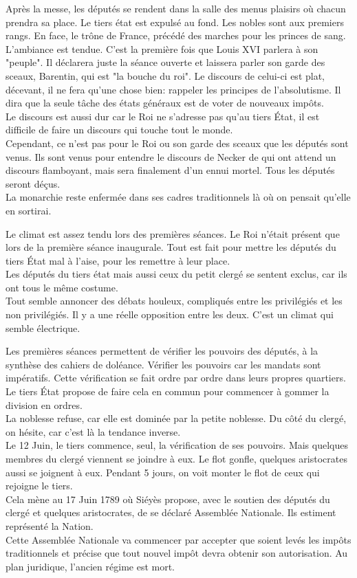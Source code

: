 \documentclass[10pt, a4paper, openany]{book}
\begin{document}
Après la messe, les députés se rendent dans la salle des menus plaisirs où chacun prendra sa place. Le tiers état est expulsé au fond. Les nobles sont aux premiers rangs. En face, le trône de France, précédé des marches pour les princes de sang. \\
L'ambiance est tendue. C'est la première fois que Louis XVI parlera à son "peuple". Il déclarera juste la séance ouverte et laissera parler son garde des sceaux, Barentin, qui est "la bouche du roi". Le discours de celui-ci est plat, décevant, il ne fera qu'une chose bien: rappeler les principes de l'absolutisme. Il dira que la seule tâche des états généraux est de voter de nouveaux impôts. \\
Le discours est aussi dur car le Roi ne s'adresse pas qu'au tiers État, il est difficile de faire un discours qui touche tout le monde. \\
Cependant, ce n'est pas pour le Roi ou son garde des sceaux que les députés sont venus. Ils sont venus pour entendre le discours de Necker de qui ont attend un discours flamboyant, mais sera finalement d'un ennui mortel. Tous les députés seront déçus. \\
La monarchie reste enfermée dans ses cadres traditionnels là où on pensait qu'elle en sortirai. 


Le climat est assez tendu lors des premières séances. Le Roi n'était présent que lors de la première séance inaugurale. Tout est fait pour mettre les députés du tiers État mal à l'aise, pour les remettre à leur place. \\
Les députés du tiers état mais aussi ceux du petit clergé se sentent exclus, car ils ont tous le même costume. \\
Tout semble annoncer des débats houleux, compliqués entre les privilégiés et les non privilégiés. Il y a une réelle opposition entre les deux. C'est un climat qui semble électrique. 


Les premières séances permettent de vérifier les pouvoirs des députés, à la synthèse des cahiers de doléance. Vérifier les pouvoirs car les mandats sont impératifs. Cette vérification se fait ordre par ordre dans leurs propres quartiers. Le tiers État propose de faire cela en commun pour commencer à gommer la division en ordres. \\
La noblesse refuse, car elle est dominée par la petite noblesse. Du côté du clergé, on hésite, car c'est là la tendance inverse. \\
Le 12 Juin, le tiers commence, seul, la vérification de ses pouvoirs. Mais quelques membres du clergé viennent se joindre à eux. Le flot gonfle, quelques aristocrates aussi se joignent à eux. Pendant 5 jours, on voit monter le flot de ceux qui rejoigne le tiers. \\
Cela mène au 17 Juin 1789 où Siéyès propose, avec le soutien des députés du clergé et quelques aristocrates, de se déclaré Assemblée Nationale. Ils estiment représenté la Nation. \\
Cette Assemblée Nationale va commencer par accepter que soient levés les impôts traditionnels et précise que tout nouvel impôt devra obtenir son autorisation. Au plan juridique, l'ancien régime est mort. 
\end{document}
